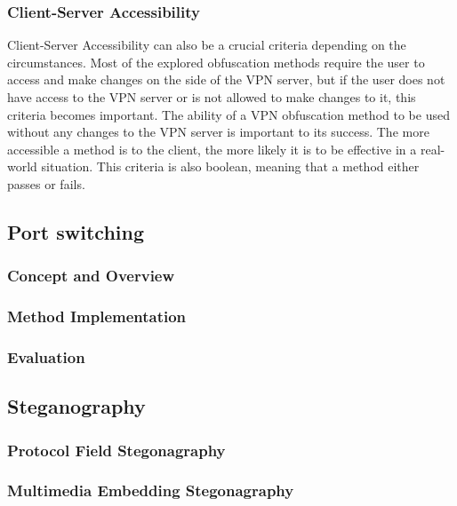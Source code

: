 \documentclass[12pt, fleqn, a4paper]{article}
\begin{document}
\subsubsection{Client-Server Accessibility}
Client-Server Accessibility can also be a crucial criteria depending on the circumstances. Most of the explored obfuscation methods require the user to access and make changes on the side of the VPN server, but if the user does not have access to the VPN server or is not allowed to make changes to it, this criteria becomes important. The ability of a VPN obfuscation method to be used without any changes to the VPN server is important to its success. The more accessible a method is to the client, the more likely it is to be effective in a real-world situation. This criteria is also boolean, meaning that a method either passes or fails.
\subsection{Port switching}
\subsubsection{Concept and Overview}
\subsubsection{Method Implementation}
\subsubsection{Evaluation}
\subsection{Steganography}
\subsubsection{Protocol Field Stegonagraphy}
\subsubsection{Multimedia Embedding Stegonagraphy}
\end{document}
